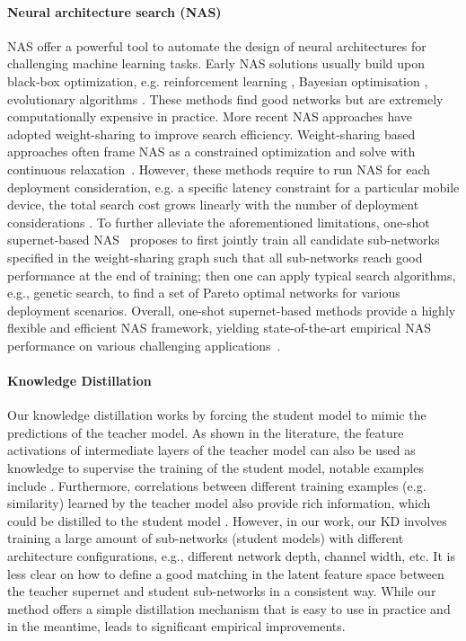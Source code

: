 \documentclass{article}
\begin{document}
\paragraph{Neural architecture search (NAS)}
NAS offer a powerful tool to automate the design of neural architectures for challenging machine learning tasks.
Early NAS solutions usually build upon black-box optimization, e.g. reinforcement learning \citep[e.g.,][]{zoph2016neural}, Bayesian optimisation \citep[e.g.,][]{kandasamy2018neural}, evolutionary algorithms \citep[e.g.,][]{real2019regularized}. These methods find good networks but are extremely computationally expensive in practice.
More recent NAS approaches have adopted weight-sharing \citep{pham2018efficient} to improve search efficiency. 
Weight-sharing based approaches often frame NAS as a constrained optimization and solve with continuous relaxation~\citep[e.g.,][]{liu2018darts, cai2018proxylessnas}. 
However, these methods require to run NAS for each deployment consideration, 
 e.g. a specific latency constraint for a particular mobile device, 
the total search cost grows linearly with the number of deployment considerations  \citep{cai2019once}. 
To further alleviate the aforementioned limitations, 
one-shot supernet-based NAS~\citep[e.g.,][]{cai2019once, yu2020bignas, wang2020attentivenas} proposes to first jointly train 
 all candidate sub-networks specified in the weight-sharing graph such that all sub-networks reach good performance at the end of training; 
 then one can apply typical search algorithms, e.g., genetic search, to find a set of Pareto optimal networks for various deployment scenarios. Overall, one-shot supernet-based methods provide a highly flexible and efficient NAS framework, yielding state-of-the-art empirical NAS performance on various challenging applications~\citep[e.g.,][]{cai2019once, wang2020hat}.

\paragraph{Knowledge Distillation} 
Our knowledge distillation works by forcing the student model to mimic the predictions of the teacher model.
As shown in the literature, the feature activations of intermediate layers of the teacher model can also be used as knowledge to supervise the training of the student model, 
notable examples include \citep[e.g.,]{romero2014fitnets,  huang2017like, ahn2019variational, jang2019learning, passalis2018learning, li2019hint}. 
Furthermore, correlations between different training examples (e.g. similarity) learned by the teacher model also provide rich information, which could be distilled to the student model \citep{park2019relational, yim2017gift}.
However, in our work, our KD involves training a large amount of sub-networks (student models) with different architecture configurations, e.g., different network depth, channel width, etc. 
It is less clear on how to define a good matching in the latent feature space between the teacher supernet and student sub-networks in a consistent way. 
While our  method offers a simple distillation mechanism that is easy to use in practice and in the meantime, leads to significant empirical improvements. 
\end{document}
